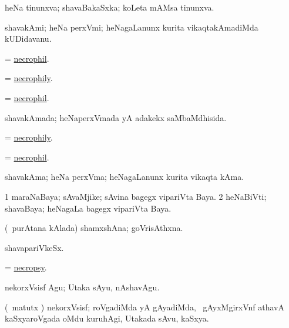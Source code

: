 \bentry
{}
\gl{\gu}
\bmng
heNa tinunxva; shavaBakaSxka; koLeta mAMsa tinunxva. 
\emng
\eentry

\bentry
{}
\gl{\nA}
\bmng
shavakAmi; heNa perxVmi; heNagaLanunx kurita vikaqtakAmadiMda kUDidavanu. 
\emng
\eentry

\bentry
{}
\gl{\nA}
\bmng
= \hyperlink{necrophil}{necrophil}. 
\emng
\eentry

\bentry
{}
\gl{\nA}
\bmng
= \hyperlink{necrophily}{necrophily}. 
\emng
\eentry

\bentry
{}
\gl{\nA}
\bmng
= \hyperlink{necrophil}{necrophil}. 
\emng
\eentry

\bentry
{}
\gl{\gu}
\bmng
shavakAmada; heNaperxVmada yA adakekx saMbaMdhisida. 
\emng
\eentry

\bentry
{}
\gl{\nA}
\bmng
= \hyperlink{necrophily}{necrophily}. 
\emng
\eentry

\bentry
{}
\gl{\nA}
\bmng
= \hyperlink{necrophil}{necrophil}. 
\emng
\eentry

\bentry
{}
\gl{\nA}
\bmng
shavakAma; heNa perxVma; heNagaLanunx kurita vikaqta kAma. 
\emng
\eentry

\bentry
{}
\gl{\nA}
\bmng
\bnum
\num{1} maraNaBaya; sAvaMjike; sAvina bagegx vipariVta Baya. 
\num{2} heNaBiVti; shavaBaya; heNagaLa bagegx vipariVta Baya. 
\enum
\emng
\eentry

\bentry
{}
\gl{\nA}
\bmng
(\kanmu\ purAtana kAlada) shamxshAna; goVrisAthxna. 
\emng
\eentry

\bentry
{}
\gl{\nA}
\bmng
shavapariVkeSx. 
\emng
\eentry

\bentry
{}
\gl{\nA}
\bmng
= \hyperlink{necropsy}{necropsy}. 
\emng
\eentry

\bentry
{}
\gl{\akirx}
\bmng
nekorxVsisf Agu; Utaka sAyu, nAshavAgu. 
\emng
\eentry

\bentry
{}
\gl{\nA}
\bmng
(\veYshA\ matutx \shavi) nekorxVsisf; roVgadiMda yA gAyadiMda, \kanmu\ gAyxMgirxVnf athavA kaSxyaroVgada oMdu kuruhAgi, Utakada sAvu, kaSxya. 
\emng
\eentry

